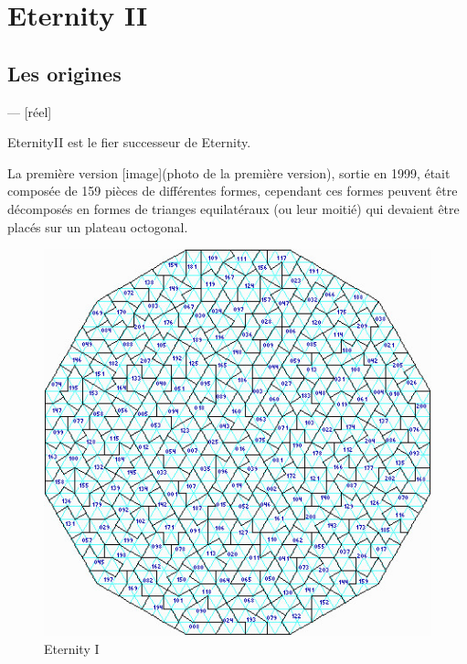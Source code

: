 \section{Eternity II}
	\subsection{Les origines}
	--- [réel]
	
	EternityII est le fier successeur de Eternity.
	
	La première version [image](photo de la première version), sortie en 1999, était composée de 159 pièces de différentes formes, cependant ces formes peuvent être décomposés en formes de trianges equilatéraux (ou leur moitié) qui devaient être placés sur un plateau octogonal. 
	
	\begin{figure}[H]
		\includegraphics[width=\linewidth]{images/eternity_1.jpg}
		\caption{Eternity I}\label{fig:eternity_1}
		\endminipage\hfill

\end{figure}
